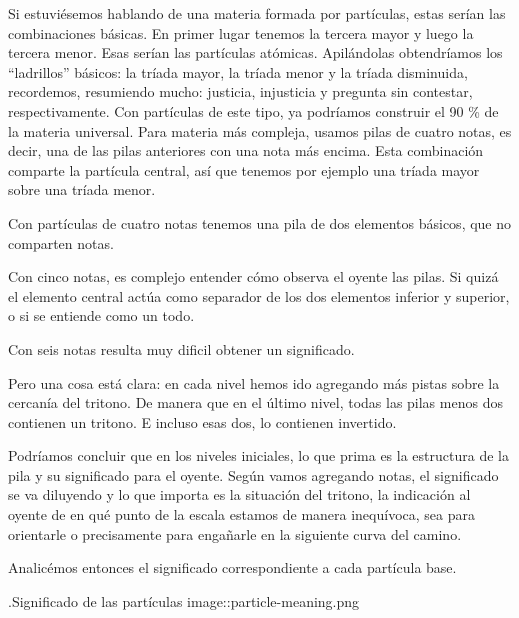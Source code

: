 \documentclass[]{article}
\begin{document}
Si estuviésemos hablando de una materia formada por partículas, estas serían las combinaciones básicas. En primer lugar tenemos la tercera mayor y luego la tercera menor. Esas serían las partículas atómicas. Apilándolas obtendríamos los ``ladrillos'' básicos: la tríada mayor, la tríada menor y la tríada disminuida, recordemos, resumiendo mucho: justicia, injusticia y pregunta sin contestar, respectivamente. Con partículas de este tipo, ya podríamos construir el 90 \% de la materia universal. Para materia más compleja, usamos pilas de cuatro notas, es decir, una de las pilas anteriores con una nota más encima. Esta combinación comparte la partícula central, así que tenemos por ejemplo una tríada mayor sobre una tríada menor.

Con partículas de cuatro notas tenemos una pila de dos elementos básicos, que no comparten notas.

Con cinco notas, es complejo entender cómo observa el oyente las pilas. Si quizá el elemento central actúa como separador de los dos elementos inferior y superior, o si se entiende como un todo.

Con seis notas resulta muy dificil obtener un significado.

Pero una cosa está clara: en cada nivel hemos ido agregando más pistas sobre la cercanía del tritono. De manera que en el último nivel, todas las pilas menos dos contienen un tritono. E incluso esas dos, lo contienen invertido.

Podríamos concluir que en los niveles iniciales, lo que prima es la estructura de la pila y su significado para el oyente. Según vamos agregando notas, el significado se va diluyendo y lo que importa es la situación del tritono, la indicación al oyente de en qué punto de la escala estamos de manera inequívoca, sea para orientarle o precisamente para engañarle en la siguiente curva del camino.

Analicémos entonces el significado correspondiente a cada partícula base.

.Significado de las partículas image::particle-meaning.png
\end{document}

